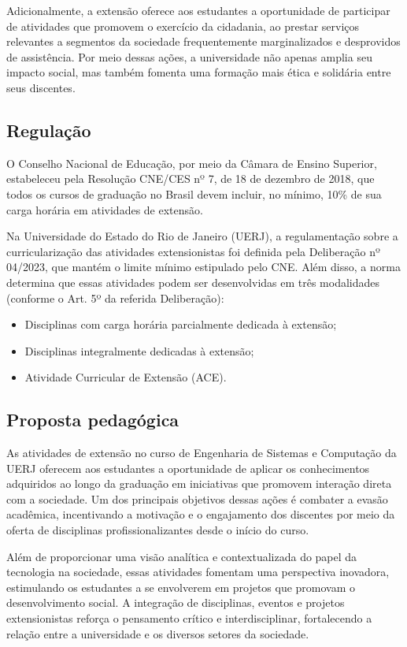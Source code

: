 Adicionalmente, a extensão oferece aos estudantes a oportunidade de participar de atividades que promovem o exercício da cidadania, ao prestar serviços relevantes a segmentos da sociedade frequentemente marginalizados e desprovidos de assistência. Por meio dessas ações, a universidade não apenas amplia seu impacto social, mas também fomenta uma formação mais ética e solidária entre seus discentes.


\subsection{Regulação}

O Conselho Nacional de Educação, por meio da Câmara de Ensino Superior, estabeleceu pela Resolução CNE/CES nº 7, de 18 de dezembro de 2018, que todos os cursos de graduação no Brasil devem incluir, no mínimo, 10\% de sua carga horária em atividades de extensão.

Na Universidade do Estado do Rio de Janeiro (UERJ), a regulamentação sobre a curricularização das atividades extensionistas foi definida pela Deliberação nº 04/2023, que mantém o limite mínimo estipulado pelo CNE. Além disso, a norma determina que essas atividades podem ser desenvolvidas em três modalidades (conforme o Art. 5º da referida Deliberação):

\begin{itemize}
    \item Disciplinas com carga horária parcialmente dedicada à extensão;
    \item Disciplinas integralmente dedicadas à extensão;
    \item Atividade Curricular de Extensão (ACE).
\end{itemize}

\subsection{Proposta pedagógica}

As atividades de extensão no curso de Engenharia de Sistemas e Computação da UERJ oferecem aos estudantes a oportunidade de aplicar os conhecimentos adquiridos ao longo da graduação em iniciativas que promovem interação direta com a sociedade. Um dos principais objetivos dessas ações é combater a evasão acadêmica, incentivando a motivação e o engajamento dos discentes por meio da oferta de disciplinas profissionalizantes desde o início do curso.

Além de proporcionar uma visão analítica e contextualizada do papel da tecnologia na sociedade, essas atividades fomentam uma perspectiva inovadora, estimulando os estudantes a se envolverem em projetos que promovam o desenvolvimento social. A integração de disciplinas, eventos e projetos extensionistas reforça o pensamento crítico e interdisciplinar, fortalecendo a relação entre a universidade e os diversos setores da sociedade.

